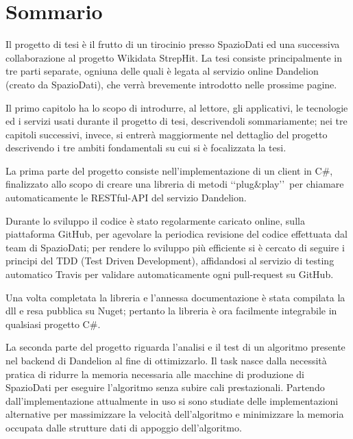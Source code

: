 \chapter*{Sommario} %
\label{sommario}


Il progetto di tesi è il frutto di un tirocinio presso SpazioDati ed una successiva collaborazione al progetto Wikidata StrepHit. La tesi consiste principalmente in tre parti separate, ogniuna delle quali è
legata al servizio online Dandelion (creato da SpazioDati), che verrà brevemente introdotto nelle prossime pagine. 

Il primo capitolo ha lo scopo di introdurre, al lettore, gli applicativi, le tecnologie ed i servizi usati durante il progetto di tesi, descrivendoli sommariamente; 
nei tre capitoli successivi, invece, si entrerà maggiormente nel dettaglio del progetto descrivendo i tre ambiti fondamentali su cui si è focalizzata la tesi.

La prima parte del progetto consiste nell'implementazione di un client in C$\#$, finalizzato allo scopo di creare una libreria di metodi \lq\lq plug$\&$play\rq\rq\ 
per chiamare automaticamente le RESTful-API del servizio Dandelion. 

Durante lo sviluppo il codice è stato regolarmente caricato online, sulla piattaforma GitHub, per agevolare la periodica revisione del codice effettuata dal team di SpazioDati; 
per rendere lo sviluppo più efficiente si è cercato di seguire i principi del TDD (Test Driven Development), affidandosi al servizio di testing automatico Travis 
per validare automaticamente ogni pull-request su GitHub. 

Una volta completata la libreria e l'annessa documentazione è stata compilata la dll e resa pubblica su Nuget; 
pertanto la libreria è ora facilmente integrabile in qualsiasi progetto C$\#$.

La seconda parte del progetto riguarda l'analisi e il test di un algoritmo presente nel backend di Dandelion al fine di ottimizzarlo. 
Il task nasce dalla necessità pratica di ridurre la memoria necessaria alle macchine di produzione di SpazioDati per eseguire l'algoritmo senza subire cali prestazionali.
Partendo dall'implementazione attualmente in uso si sono studiate delle implementazioni alternative per massimizzare la velocità dell'algoritmo e minimizzare 
la memoria occupata dalle strutture dati di appoggio dell'algoritmo. 

